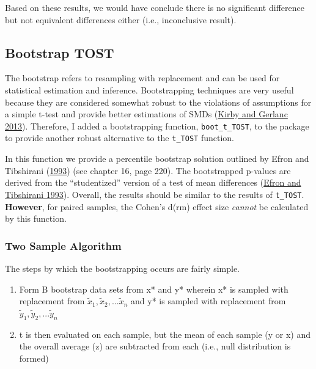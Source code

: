 \documentclass[
]{interact}
\begin{document}
Based on these results, we would have conclude there is no significant
difference but not equivalent differences either (i.e., inconclusive
result).

\newpage

\hypertarget{bootstrap-tost}{%
\subsection{Bootstrap TOST}\label{bootstrap-tost}}

The bootstrap refers to resampling with replacement and can be used for
statistical estimation and inference. Bootstrapping techniques are very
useful because they are considered somewhat robust to the violations of
assumptions for a simple t-test and provide better estimations of SMDs
(\protect\hyperlink{ref-Kirby2013}{Kirby and Gerlanc 2013}). Therefore,
I added a bootstrapping function, \texttt{boot\_t\_TOST}, to the package
to provide another robust alternative to the \texttt{t\_TOST} function.

In this function we provide a percentile bootstrap solution outlined by
Efron and Tibshirani (\protect\hyperlink{ref-efron93}{1993}) (see
chapter 16, page 220). The bootstrapped p-values are derived from the
``studentized'' version of a test of mean differences
(\protect\hyperlink{ref-efron93}{Efron and Tibshirani 1993}). Overall,
the results should be similar to the results of \texttt{t\_TOST}.
\textbf{However}, for paired samples, the Cohen's d(rm) effect size
\emph{cannot} be calculated by this function.

\hypertarget{two-sample-algorithm}{%
\subsubsection{Two Sample Algorithm}\label{two-sample-algorithm}}

The steps by which the bootstrapping occurs are fairly simple.

\begin{enumerate}
\def\labelenumi{\arabic{enumi}.}
\item
  Form B bootstrap data sets from x* and y* wherein x* is sampled with
  replacement from \(\tilde x_1,\tilde x_2, ... \tilde x_n\) and y* is
  sampled with replacement from
  \(\tilde y_1,\tilde y_2, ... \tilde y_n\)
\item
  t is then evaluated on each sample, but the mean of each sample (y or
  x) and the overall average (z) are subtracted from each (i.e., null
  distribution is formed)
\end{enumerate}
\end{document}
